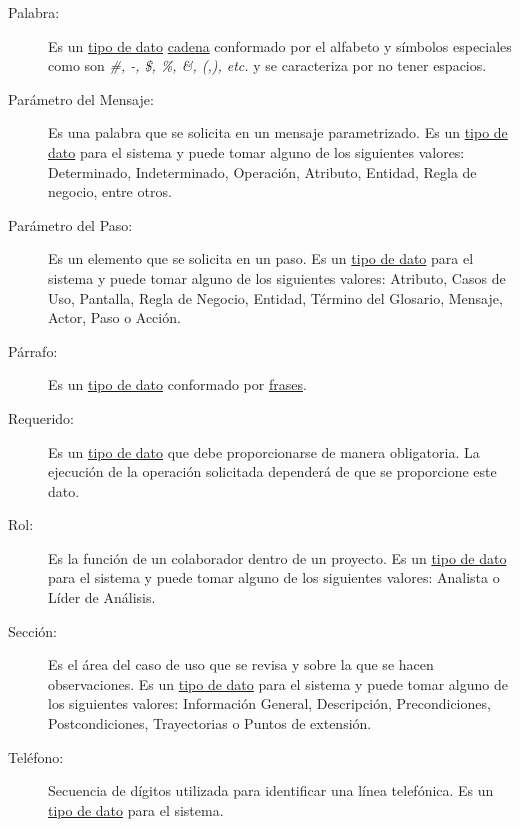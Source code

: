 \begin{description}
	\item[\hypertarget{tPalabra}{Palabra:}] Es un \hyperlink{tTipoDato}{tipo de dato} \hyperlink{tCadena}{cadena} conformado por el alfabeto y símbolos especiales como son {\em \#, -,
	\$, \%, \&, (,), etc.} y se caracteriza por no tener espacios.
	
	\item[\hypertarget{tParametroM}{Parámetro del Mensaje:}] Es una palabra que se solicita en un mensaje parametrizado. Es un \hyperlink{tTipoDato}{tipo de dato} para el sistema y puede tomar alguno de los siguientes valores: Determinado, Indeterminado, Operación, Atributo, Entidad, Regla de negocio, entre otros.
	
	\item[\hypertarget{tParametroP}{Parámetro del Paso:}] Es un elemento que se solicita en un paso. Es un \hyperlink{tTipoDato}{tipo de dato} para el sistema y puede tomar alguno de los siguientes valores: Atributo, Casos de Uso, Pantalla, Regla de Negocio, Entidad, Término del Glosario, Mensaje, Actor, Paso o Acción.
	
	\item[\hypertarget{tParrafo}{Párrafo:}] Es un \hyperlink{tTipoDato}{tipo de dato} conformado por \hyperlink{tFrase}{frases}.
	
	\item[\hypertarget{tRequerido}{Requerido:}] Es un \hyperlink{tTipoDato}{tipo de dato} que debe proporcionarse de manera obligatoria. La ejecución de la operación solicitada dependerá de que se proporcione este dato.
	
	\item[\hypertarget{tRol}{Rol:}] Es la función de un colaborador dentro de un proyecto. Es un \hyperlink{tTipoDato}{tipo de dato} para el sistema y puede tomar alguno de los siguientes valores: Analista o Líder de Análisis.
	
	\item[\hypertarget{tSeccion}{Sección:}] Es el área del caso de uso que se revisa y sobre la que se hacen observaciones. Es un \hyperlink{tTipoDato}{tipo de dato} para el sistema y puede tomar alguno de los siguientes valores: Información General, Descripción, Precondiciones, Postcondiciones, Trayectorias o Puntos de extensión.
	
	\item[\hypertarget{tTelefono}{Teléfono:}] Secuencia de dígitos utilizada para identificar una línea telefónica. Es un \hyperlink{tTipoDato}{tipo de dato} para el sistema.
	

\end{description}
